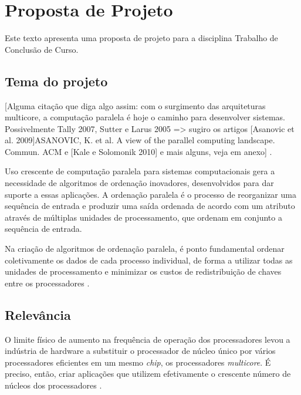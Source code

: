 \chapter{Proposta de Projeto}

Este texto apresenta uma proposta de projeto para a disciplina Trabalho de Conclusão de Curso. 

\section{Tema do projeto}

[Alguma citação que diga algo assim: com o surgimento das arquiteturas multicore, a computação paralela é hoje o caminho para desenvolver sistemas. Possivelmente Tally 2007, Sutter e Larus 2005 => sugiro os artigos [Asanovic et al. 2009]ASANOVIC, K. et al. A view of the parallel computing landscape.
Commun. ACM   e [Kale e Solomonik 2010] e mais alguns, veja em anexo] .

Uso crescente de computação paralela para sistemas computacionais gera a necessidade de algoritmos de ordenação inovadores, desenvolvidos para dar suporte a essas aplicações. A ordenação paralela é o processo de reorganizar uma sequência de entrada e produzir uma saída ordenada de acordo com um atributo através de múltiplas unidades de processamento, que ordenam em conjunto a sequência de entrada. 

Na criação de algoritmos de ordenação paralela, é ponto fundamental ordenar coletivamente os dados de cada processo individual, de forma a utilizar todas as unidades de processamento e minimizar os custos de redistribuição de chaves entre os processadores \cite{Kale:2010}. 

\section{Relevância}


O limite físico de aumento na frequência de operação dos processadores levou a indústria de hardware a substituir o processador de núcleo único por vários processadores eficientes em um mesmo \textit{chip}, os processadores \textit{multicore}. 
É preciso, então, criar aplicações que utilizem efetivamente o crescente número de núcleos dos processadores  \cite{Asanovic:2009}.


